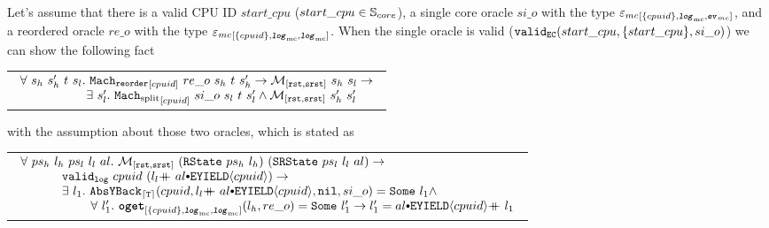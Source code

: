 \begin{lemma}
\label{lemma:chapter:conlink:reorder-refines-split}
%
Let's assume that there is a valid CPU ID $start\_cpu$ ($start\_cpu \in {\mathbb{S}_{core}}$),
a single core oracle $si\_o$ with the type $ {{{\varepsilon_{mc}}}_{[{\{cpuid\}}, {{{\mathrm{\texttt{\textbf{\textit{log}}}}}_{\mathrm{mc}}}}, {{{\mathrm{\texttt{\textbf{\textit{ev}}}}}_{mc}}}]}}$, and a reordered oracle $re\_o$ with the type ${{{\varepsilon_{mc}}}_{[{\{cpuid\}}, {{{\mathrm{\texttt{\textbf{\textit{log}}}}}_{\mathrm{mc}}}}, {{{\mathrm{\texttt{\textbf{\textit{log}}}}}_{\mathrm{mc}}}}]}}$.
When the single oracle is valid ($ {{\mathrm{\texttt{valid}}}_{{\mathrm{\texttt{EC}}}}}({start\_cpu}, {\{start\_cpu\}}, {si\_o})$) we can show the following fact
\begin{center}
\begin{tabular}{P{0.95\textwidth}}
$
\begin{array}{l}
\forall \ s_h \ s_h' \ t \ s_l . \ \singlereorderstep{cpuid}{re\_o}{s_h}{t}{s_h'} \rightarrow  \matchrstatesrstate{s_h}{s_l} \rightarrow \\
\ \ \ \ \ \ \ \ \ \ \ \ \ \ \ \ \exists\ s_l' .\ \singlesplitstep{cpuid}{si\_o}{s_l}{t}{s_l'} \wedge  \matchrstatesrstate{s_h'}{s_l'}\\
\end{array}
$
\end{tabular}
\end{center}
with the assumption about those two oracles, which is stated as 
\begin{center}
\begin{tabular}{P{0.95\textwidth}}
$
\begin{array}{l}
\forall \ ps_h \ l_h \ ps_l \ l_l \ al.\ \matchrstatesrstate{(\rstate{ps_h}{l_h})}{(\srstate{ps_l}{l_l}{al})} \rightarrow \\
\ \ \ \ \ \ \ \ \ \ \validlog{cpuid}{(\listconsoppo{\yieldev{cpuid}}{\listappoppo{al}{l_l}})} \rightarrow \\
\ \ \ \ \ \ \ \ \ \ \exists\ l_1. \ \yieldbackfunc{\timebound}{cpuid}{\listconsoppo{\yieldev{cpuid}}{\listappoppo{al}{l_l}}}{\nulllist}{si\_o}{l_1} \wedge \\ 
\ \ \ \ \ \ \ \ \ \ \ \ \ \ \ \ \ \forall \ l_1' .\  \oget{\set{cpuid}}{\mclog}{\mclog}{l_h}{re\_o}{l_1'} \rightarrow  l_1' = \listappoppo{l_1}{\listconsoppo{\yieldev{cpuid}}{al}} \\
\end{array}
$
\end{tabular}
\end{center}

\end{lemma}


